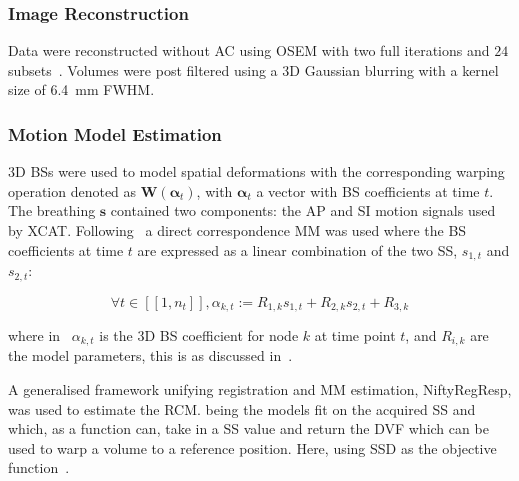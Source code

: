             \subsubsection{Image Reconstruction} \label{sec:impact_of_tof_on_respiratory_motion_model_estimation_using_pre_gated_no_intra_cycle_motion_nac_pet_methods_image_reconstruction}
                Data were reconstructed without \gls{AC} using \gls{OSEM} with two full iterations and $24$ subsets~. Volumes were post filtered using a \gls{3D} Gaussian blurring with a kernel size of \SI{6.4}{\milli\metre} \gls{FWHM}.
            
            \subsubsection{Motion Model Estimation} \label{sec:impact_of_tof_on_respiratory_motion_model_estimation_using_pre_gated_no_intra_cycle_motion_nac_pet_methods_motion_model_estimation}
                \gls{3D} \gls{BS}s were used to model spatial deformations with the corresponding warping operation denoted as $\mathbf{W}(\mathbf{\alpha}_t)$, with $\mathbf{\alpha}_t$ a vector with \gls{BS} coefficients at time $t$. The breathing  $\mathbf{s}$ contained two components: the \gls{AP} and \gls{SI} motion signals used by \gls{XCAT}. Following~ a direct correspondence \gls{MM} was used where the \gls{BS} coefficients at time $t$ are expressed as a linear combination of the two \gls{SS}, $s_{1,t}$ and $s_{2,t}$:
            
                \begin{equation}\label{eq:impact_of_tof_on_respiratory_motion_model_estimation_using_pre_gated_no_intra_cycle_motion_nac_pet_methods_motion_parameters}
                    \forall t \in [[1,n_t]], \alpha_{k,t} := R_{1,k} s_{1,t} + R_{2,k} s_{2,t} + R_{3,k}
                \end{equation}
                
                \noindent where in~ $\alpha_{k,t}$ is the \gls{3D} \gls{BS} coefficient for node $k$ at time point $t$, and $R_{i,k}$ are the model parameters, this is as discussed in~.
            
                A generalised framework unifying registration and \gls{MM} estimation, NiftyRegResp, was used to estimate the \gls{RCM}.  being the models fit on the acquired \gls{SS} and  which, as a function can, take in a \gls{SS} value and return the \gls{DVF} which can be used to warp a volume to a reference position. Here, using \gls{SSD} as the objective function~.
                
